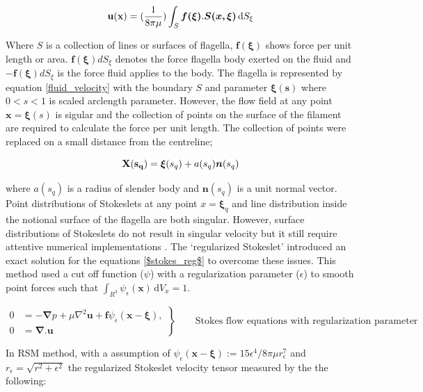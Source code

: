 \documentclass[12pt,a4paper,titlepage]{report}
\begin{document}
\begin{equation}
\bold {u(x)} =(\frac{1}{8 \pi \mu}) \int_S \mathrm \bm{f(\xi)} . \bm{S( x, \xi)}\, \mathrm{d}S_{\xi}
\label{fluid_velocity}
\end{equation}

Where $S$ is a collection of lines or surfaces of flagella, $\bm{f(\xi)}$ shows force per unit length or area.
$\bm{f(\xi)} dS_{\xi}$ denotes the force flagella body exerted on the fluid and $-\bm{f(\xi)} dS_{\xi}$ is the 
force fluid applies to the body. The flagella is represented by equation \ref{fluid_velocity} with the boundary
$S$ and parameter $\bm{\xi (s)}$ where $0 < s <1$ is scaled arclength parameter. However, the flow field
at any point $\bm{x} = \bm{\xi} (s)$ is sigular and the collection of points on the surface of the filament 
are required to calculate the force per unit length. The collection of points were replaced on a small distance 
from the centreline;

\begin{equation}
\bold {X(s_q)} = \bm{\xi}(s_q) + a(s_q) \bm{n}(s_q)
\label{centreline}
\end{equation}

where $a(s_q)$ is a radius of slender body and $\bm{n}(s_q)$ is a unit normal vector. Point distributions of 
Stokeslets at any point $x = \bm{\xi}_q$ and line distribution inside the notional surface
of the flagella are both singular. However, surface distributions of Stokeslets do not result in singular  velocity
 but it still require attentive numerical implementations \citep{smith2009boundary}. The \lq{regularized Stokeslet}\rq{}
 introduced an exact solution for the equations \ref{$stokes_reg$} to overcome these issues. 
This method used a cut off function ($\psi$) with a regularization parameter ($\epsilon$) to smooth point forces 
such that $\int_{R^3} \psi_{\epsilon} (\bm{x})\, \mathrm{d}V_x = 1$.



\begin{equation}
 \left.\begin{aligned}
        0 &= - \bm{\nabla} p + \mu \nabla ^ 2 \bm{u} + \bm{f} \psi_\epsilon (\bm{x} - \bm{\xi}), \\
        0 &=\bm{\nabla . u}
       \end{aligned}
 \right\}
 \qquad \text{Stokes flow equations with regularization parameter}
\label{stokes_reg}
\end{equation}

In RSM method, with a assumption of $\psi_{\epsilon}(\bm{x} - \bm{\xi}) := 15\epsilon^4 /8\pi \mu r_{\epsilon}^7$ 
and $r_{\epsilon} = \sqrt{r^2 + \epsilon ^2}$ the regularized Stokeslet velocity tensor measured by the the following:
\end{document}
